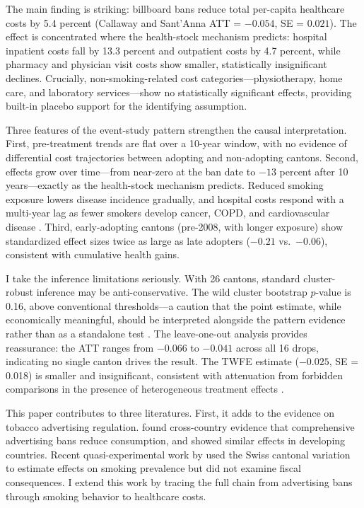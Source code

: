 \documentclass[12pt]{article}
\begin{document}
The main finding is striking: billboard bans reduce total per-capita healthcare costs by 5.4 percent (Callaway and Sant'Anna ATT = $-0.054$, SE = $0.021$). The effect is concentrated where the health-stock mechanism predicts: hospital inpatient costs fall by 13.3 percent and outpatient costs by 4.7 percent, while pharmacy and physician visit costs show smaller, statistically insignificant declines. Crucially, non-smoking-related cost categories---physiotherapy, home care, and laboratory services---show no statistically significant effects, providing built-in placebo support for the identifying assumption.

Three features of the event-study pattern strengthen the causal interpretation. First, pre-treatment trends are flat over a 10-year window, with no evidence of differential cost trajectories between adopting and non-adopting cantons. Second, effects grow over time---from near-zero at the ban date to $-13$ percent after 10 years---exactly as the health-stock mechanism predicts. Reduced smoking exposure lowers disease incidence gradually, and hospital costs respond with a multi-year lag as fewer smokers develop cancer, COPD, and cardiovascular disease \citep{jha2006avoidable, chaloupka2000economics}. Third, early-adopting cantons (pre-2008, with longer exposure) show standardized effect sizes twice as large as late adopters ($-0.21$ vs.\ $-0.06$), consistent with cumulative health gains.

I take the inference limitations seriously. With 26 cantons, standard cluster-robust inference may be anti-conservative. The wild cluster bootstrap $p$-value is 0.16, above conventional thresholds---a caution that the point estimate, while economically meaningful, should be interpreted alongside the pattern evidence rather than as a standalone test \citep{cameron2008bootstrap}. The leave-one-out analysis provides reassurance: the ATT ranges from $-0.066$ to $-0.041$ across all 16 drops, indicating no single canton drives the result. The TWFE estimate ($-0.025$, SE = 0.018) is smaller and insignificant, consistent with attenuation from forbidden comparisons in the presence of heterogeneous treatment effects \citep{goodman2021difference, dechaisemartin2020two}.

This paper contributes to three literatures. First, it adds to the evidence on tobacco advertising regulation. \citet{saffer2000tobacco} found cross-country evidence that comprehensive advertising bans reduce consumption, and \citet{blecher2008international} showed similar effects in developing countries. Recent quasi-experimental work by \citet{stoller2026billboard} used the Swiss cantonal variation to estimate effects on smoking prevalence but did not examine fiscal consequences. I extend this work by tracing the full chain from advertising bans through smoking behavior to healthcare costs.
\end{document}
